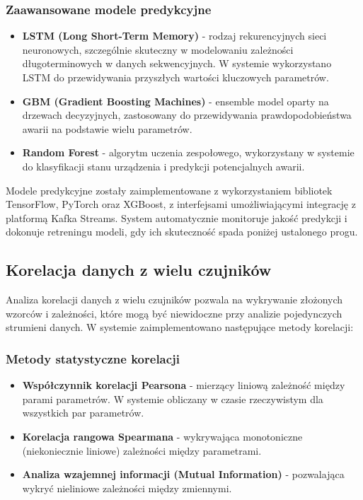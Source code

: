 \subsubsection{Zaawansowane modele predykcyjne}
\label{subsubsec:modele_predykcyjne}

\begin{itemize}
    \item \textbf{LSTM (Long Short-Term Memory)} - rodzaj rekurencyjnych sieci neuronowych, szczególnie skuteczny w modelowaniu zależności długoterminowych w danych sekwencyjnych. W systemie wykorzystano LSTM do przewidywania przyszłych wartości kluczowych parametrów.
    \item \textbf{GBM (Gradient Boosting Machines)} - ensemble model oparty na drzewach decyzyjnych, zastosowany do przewidywania prawdopodobieństwa awarii na podstawie wielu parametrów.
    \item \textbf{Random Forest} - algorytm uczenia zespołowego, wykorzystany w systemie do klasyfikacji stanu urządzenia i predykcji potencjalnych awarii.
\end{itemize}

Modele predykcyjne zostały zaimplementowane z wykorzystaniem bibliotek TensorFlow, PyTorch oraz XGBoost, z interfejsami umożliwiającymi integrację z platformą Kafka Streams. System automatycznie monitoruje jakość predykcji i dokonuje retreningu modeli, gdy ich skuteczność spada poniżej ustalonego progu.

\subsection{Korelacja danych z wielu czujników}
\label{subsec:korelacja_danych}

Analiza korelacji danych z wielu czujników pozwala na wykrywanie złożonych wzorców i zależności, które mogą być niewidoczne przy analizie pojedynczych strumieni danych. W systemie zaimplementowano następujące metody korelacji:

\subsubsection{Metody statystyczne korelacji}
\label{subsubsec:statystyczne_korelacje}

\begin{itemize}
    \item \textbf{Współczynnik korelacji Pearsona} - mierzący liniową zależność między parami parametrów. W systemie obliczany w czasie rzeczywistym dla wszystkich par parametrów.
    \item \textbf{Korelacja rangowa Spearmana} - wykrywająca monotoniczne (niekoniecznie liniowe) zależności między parametrami.
    \item \textbf{Analiza wzajemnej informacji (Mutual Information)} - pozwalająca wykryć nieliniowe zależności między zmiennymi.
\end{itemize}

